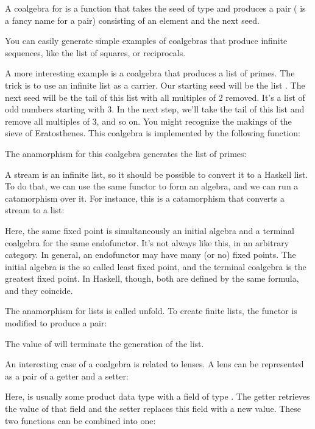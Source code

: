 A coalgebra for  is a function that takes the seed of
type  and produces a pair ( is a fancy name
for a pair) consisting of an element and the next seed.

You can easily generate simple examples of coalgebras that produce
infinite sequences, like the list of squares, or reciprocals.

A more interesting example is a coalgebra that produces a list of
primes. The trick is to use an infinite list as a carrier. Our starting
seed will be the list \code{{[}2..{]}}. The next seed will be the tail
of this list with all multiples of 2 removed. It's a list of odd numbers
starting with 3. In the next step, we'll take the tail of this list and
remove all multiples of 3, and so on. You might recognize the makings of
the sieve of Eratosthenes. This coalgebra is implemented by the
following function:

The anamorphism for this coalgebra generates the list of primes:

A stream is an infinite list, so it should be possible to convert it to
a Haskell list. To do that, we can use the same functor 
to form an algebra, and we can run a catamorphism over it. For instance,
this is a catamorphism that converts a stream to a list:

Here, the same fixed point is simultaneously an initial algebra and a
terminal coalgebra for the same endofunctor. It's not always like this,
in an arbitrary category. In general, an endofunctor may have many (or
no) fixed points. The initial algebra is the so called least fixed
point, and the terminal coalgebra is the greatest fixed point. In
Haskell, though, both are defined by the same formula, and they
coincide.

The anamorphism for lists is called unfold. To create finite lists, the
functor is modified to produce a  pair:

The value of  will terminate the generation of the list.

An interesting case of a coalgebra is related to lenses. A lens can be
represented as a pair of a getter and a setter:

Here,  is usually some product data type with a field of type
. The getter retrieves the value of that field and the setter
replaces this field with a new value. These two functions can be
combined into one:

